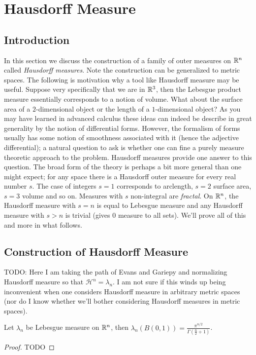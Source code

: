\section{Hausdorff Measure}

\subsection{Introduction}

In this section we discuss the construction of a family of outer
measures on $\mathbb{R}^n$ called \emph{Hausdorff measures}.  Note the
construction can be generalized to metric spaces.  The following is
motivation why a tool like Hausdorff measure may be useful.  Suppose
very specifically that we are
in $\mathbb{R}^3$, then the Lebesgue product measure essentially
corresponds to a notion of volume.  What about the surface area of a
$2$-dimensional object or the length of a $1$-dimensional object?  As
you may have learned in advanced calculus these ideas can indeed be
describe in great generality by the notion of differential forms.
However, the formalism of forms usually has some notion of smoothness
associated with it (hence the adjective differential); a natural question to ask is whether one can fine
a purely measure theoretic approach to the problem.  Hausdorff measures
provide one answer to this question.   The broad form of the theory
is perhaps a bit more general than one might expect; for any space
there is a Hausdorff outer measure for every real number $s$.  The
case of integers
$s=1$ corresponds to arclength, $s=2$ surface area, $s=3$ volume and so
on.  Measures with $s$ non-integral are
\emph{fractal}.  On $\mathbb{R}^n$, the Hausdorff measure with $s=n$ is equal to
Lebesgue measure and any Hausdorff measure with $s > n$ is trivial
(gives $0$ measure to all sets).  We'll prove all of this and more in
what follows.

\subsection{Construction of Hausdorff Measure}

TODO:  Here I am taking the path of Evans and Gariepy and normalizing
Hausdorff measure so that $\mathcal{H}^n = \lambda_n$.  I am not sure
if this winds up being inconvenient when one considers Hausdorff
measure in arbitrary metric spaces (nor do I know whether we'll bother
considering Hausdorff measures in metric spaces).

\begin{lem}Let $\lambda_n$ be Lebesgue measure on $\mathbb{R}^n$, then
  $\lambda_n(B(0, 1)) = \frac{\pi^{n/2}}{\Gamma(\frac{n}{2} + 1)}$.
\end{lem}
\begin{proof}
TODO
\end{proof}

